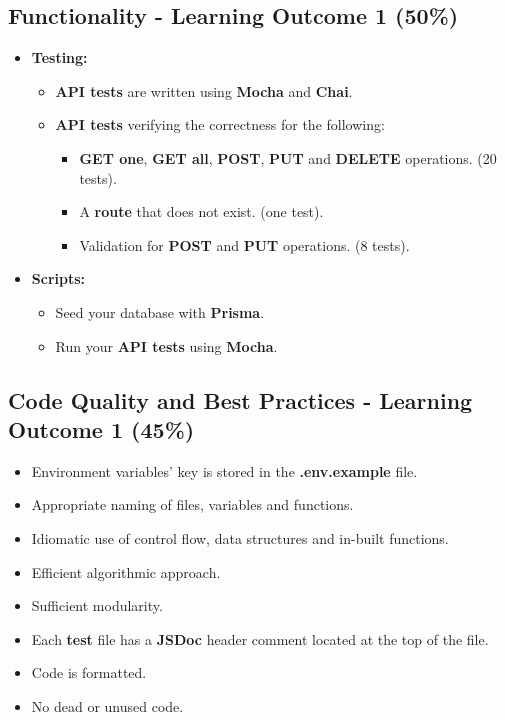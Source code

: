 \documentclass{article}
\begin{document}
\subsection*{Functionality - Learning Outcome 1 (50\%)}
\begin{itemize}
  \item \textbf{Testing:}
	\begin{itemize}
    \item \textbf{API tests} are written using \textbf{Mocha} and \textbf{Chai}.
    \item \textbf{API tests} verifying the correctness for the following:
      \begin{itemize}
        \item \textbf{GET one}, \textbf{GET all}, \textbf{POST}, \textbf{PUT} and \textbf{DELETE} operations. (20 tests).
        \item A \textbf{route} that does not exist. (one test).
        \item Validation for \textbf{POST} and \textbf{PUT} operations. (8 tests).
      \end{itemize}
	\end{itemize}
	\item \textbf{Scripts:}
	\begin{itemize}
    \item Seed your database with \textbf{Prisma}.
		\item Run your \textbf{API tests} using \textbf{Mocha}.
	\end{itemize}
\end{itemize}

\subsection*{Code Quality and Best Practices - Learning Outcome 1 (45\%)}
\begin{itemize}
  \item Environment variables' key is stored in the \textbf{.env.example} file. 
  \item Appropriate naming of files, variables and functions.
	\item Idiomatic use of control flow, data structures and in-built functions.
  \item Efficient algorithmic approach.
  \item Sufficient modularity.
	\item Each \textbf{test} file has a \textbf{JSDoc} header comment located at the top of the file.
	\item Code is formatted.
  \item No dead or unused code.
\end{itemize}  
\end{document}

